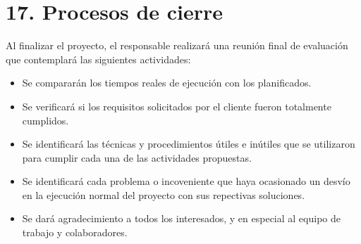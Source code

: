 \documentclass[11pt]{charter}
\begin{document}
\section{17. Procesos de cierre}    
\label{sec:cierre}

Al finalizar el proyecto, el responsable realizará una reunión final de evaluación que contemplará las siguientes actividades:

\begin{itemize}
\item Se compararán los tiempos reales de ejecución con los planificados.
\item Se verificará si los requisitos solicitados por el cliente fueron totalmente cumplidos.
\item Se identificará las técnicas y procedimientos útiles e inútiles que se utilizaron para cumplir cada una de las actividades propuestas.
\item Se identificará cada problema o incoveniente que haya ocasionado un desvío en la ejecución normal del proyecto con sus repectivas soluciones.
\item Se dará agradecimiento a todos los interesados, y en especial al equipo de trabajo y colaboradores.
\end{itemize}
\end{document}
